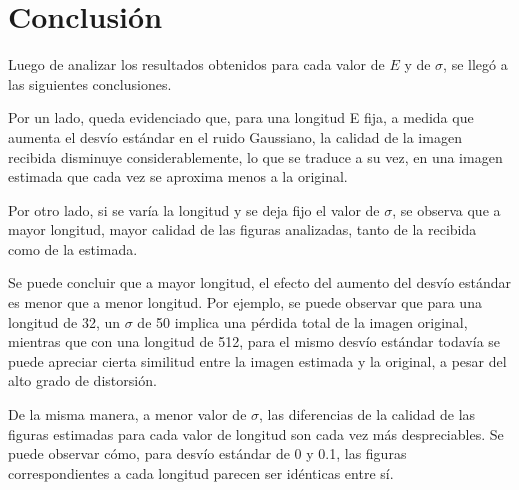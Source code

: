 \documentclass[a4paper]{article}
\begin{document}
\section{Conclusión}
	Luego de analizar los resultados obtenidos para cada valor de $ E $ y de $ \sigma $, se llegó a las siguientes conclusiones.\par
	Por un lado, queda evidenciado que, para una longitud E fija, a medida que aumenta el desvío estándar en el ruido Gaussiano, la calidad de la imagen recibida disminuye considerablemente, lo que se traduce a su vez, en una imagen estimada que cada vez se aproxima menos a la original.\par
	Por otro lado, si se varía la longitud y se deja fijo el valor de $ \sigma $, se observa que a mayor longitud, mayor calidad de las figuras analizadas, tanto de la recibida como de la estimada.\par
	Se puede concluir que a mayor longitud, el efecto del aumento del desvío estándar es menor que a menor longitud. Por ejemplo, se puede observar que para una longitud de 32, un $ \sigma $ de 50 implica una pérdida total de la imagen original, mientras que con una longitud de 512, para el mismo desvío estándar todavía se puede apreciar cierta similitud entre la imagen estimada y la original, a pesar del alto grado de distorsión.\par
	De la misma manera, a menor valor de $ \sigma $, las diferencias de la calidad de las figuras estimadas para cada valor de longitud son cada vez más despreciables. Se puede observar cómo, para desvío estándar de 0 y 0.1, las figuras correspondientes a cada longitud parecen ser idénticas entre sí.
 
\end{document}
